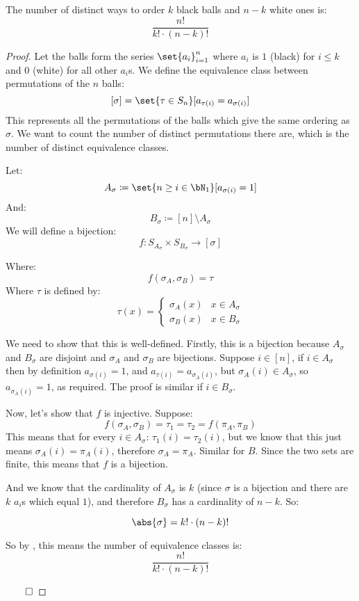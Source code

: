 \begin{thrm*}[twoObjOrderingsTheorem]

	The number of distinct ways to order $k$ black balls and $n-k$ white ones is:
	\[ \frac{n!}{k!\cdot(n-k)!} \]

\end{thrm*}

\begin{proof}

	Let the balls form the series $\set{a_i}_{i=1}^n$ where $a_i$ is $1$ (black) for $i\leq k$ and $0$ (white) for all other
	$a_i$s. We define the equivalence class between permutations of the $n$ balls:
	\[ [\sigma] = \set{\tau\in S_n}[a_{\tau(i)} = a_{\sigma(i)}] \]
	This represents all the permutations of the balls which give the same ordering as $\sigma$. We want to count the number
	of distinct permutations there are, which is the number of distinct equivalence classes.

	Let:
	\[ A_\sigma\coloneqq\set{n\geq i\in\bN_1}[a_{\sigma(i)}=1] \]
	And:
	\[ B_\sigma\coloneqq[n]\setminus A_\sigma \]
	We will define a bijection:
	\[ f\colon S_{A_\sigma}\times S_{B_\sigma}\longrightarrow[\sigma] \]

	Where:
	\[ f(\sigma_A, \sigma_B) = \tau \]
	Where $\tau$ is defined by:
	\[ \tau(x) = \begin{cases} \sigma_A(x) & x\in A_\sigma \\ \sigma_B(x) & x\in B_\sigma \end{cases} \]

	We need to show that this is well-defined. Firstly, this is a bijection because $A_\sigma$ and $B_\sigma$ are disjoint and
	$\sigma_A$ and $\sigma_B$ are bijections.
	Suppose $i\in[n]$, if $i\in A_\sigma$ then by definition $a_{\sigma(i)}=1$, and $a_{\tau(i)} = a_{\sigma_A(i)}$,
	but $\sigma_A(i)\in A_\sigma$, so $a_{\sigma_A(i)}=1$, as required.
	The proof is similar if $i\in B_\sigma$.

	Now, let's show that $f$ is injective. Suppose:
	\[ f(\sigma_A, \sigma_B) = \tau_1 = \tau_2 = f(\pi_A, \pi_B) \]
	This means that for every $i\in A_\sigma$: $\tau_1(i)=\tau_2(i)$, but we know that this just means $\sigma_A(i)=\pi_A(i)$,
	therefore $\sigma_A=\pi_A$. Similar for $B$. Since the two sets are finite, this means that $f$ is a bijection.
	
	And we know that the cardinality of $A_\sigma$ is $k$ (since $\sigma$ is a bijection and there are $k$ $a_i$s which equal
	$1$), and therefore $B_\sigma$ has a cardinality of $n-k$. So:

	\[ \abs{\sigma} = k!\cdot(n-k)! \]
	
	So by , this means the number of equivalence classes is:
	\[ \frac{n!}{k!\cdot(n-k)!} \]

	\hfill$\qed$

\end{proof}

